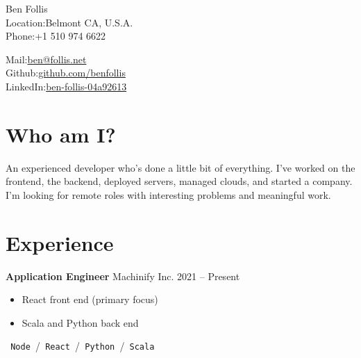 \documentclass{res}
\begin{document}


{\huge Ben Follis}\\

Location:{Belmont CA, U.S.A.}\\
Phone:{+1 510 974 6622}\\
\vspace{-\baselineskip} %

Mail:{\href{mailto:ben@follis.net}{ben@follis.net}}\\
Github:{\href{https://github.com/benfollis}{github.com/benfollis}}\\
LinkedIn:{\href{https://www.linkedin.com/in/ben-follis-04a92613}{ben-follis-04a92613}}\\



\section{Who am I?}
An experienced developer who's done a little bit of everything.
I've worked on the frontend, the backend, deployed servers, managed clouds, and started a company.
I'm looking for remote roles with interesting problems and meaningful work.


\section{Experience}
        {\bf Application Engineer} \hfill Machinify Inc. \hfill 2021 -- Present
        \begin{itemize}
        \item React front end (primary focus)
        \item Scala and Python back end
        \end{itemize}
        \texttt{ Node }\slash\texttt{ React }\slash\texttt{ Python }\slash\texttt{ Scala }\\
\end{document}

